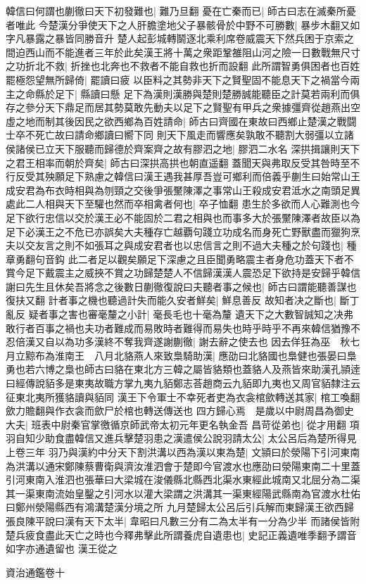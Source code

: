 韓信曰何謂也蒯徹曰天下初發難也|{
	難乃旦翻}
憂在亡秦而已|{
	師古曰志在滅秦所憂者唯此}
今楚漢分爭使天下之人肝膽塗地父子暴骸骨於中野不可勝數|{
	暴步木翻又如字凡暴露之暴皆同勝音升}
楚人起彭城轉鬬逐北乘利席卷威震天下然兵困于京索之間迫西山而不能進者三年於此矣漢王將十萬之衆距鞏雒阻山河之險一日數戰無尺寸之功折北不救|{
	折挫也北奔也不救者不能自救也折而設翻}
此所謂智勇俱困者也百姓罷極怨望無所歸倚|{
	罷讀曰疲}
以臣料之其勢非天下之賢聖固不能息天下之禍當今兩主之命縣於足下|{
	縣讀曰懸}
足下為漢則漢勝與楚則楚勝誠能聽臣之計莫若兩利而俱存之參分天下鼎足而居其勢莫敢先動夫以足下之賢聖有甲兵之衆據彊齊從趙燕出空虛之地而制其後因民之欲西鄉為百姓請命|{
	師古曰齊國在東故曰西鄉止楚漢之戰闘士卒不死亡故曰請命鄉讀曰嚮下同}
則天下風走而響應矣孰敢不聽割大弱彊以立諸侯諸侯已立天下服聽而歸德於齊案齊之故有膠泗之地|{
	膠泗二水名}
深拱揖讓則天下之君王相率而朝於齊矣|{
	師古曰深拱高拱也朝直遥翻}
蓋聞天與弗取反受其咎時至不行反受其殃願足下熟慮之韓信曰漢王遇我甚厚吾豈可鄉利而倍義乎蒯生曰始常山王成安君為布衣時相與為刎頸之交後爭張黶陳澤之事常山王殺成安君泜水之南頭足異處此二人相與天下至驩也然而卒相禽者何也|{
	卒子恤翻}
患生於多欲而人心難測也今足下欲行忠信以交於漢王必不能固於二君之相與也而事多大於張黶陳澤者故臣以為足下必漢王之不危已亦誤矣大夫種存亡越覇句踐立功成名而身死亡野獸盡而獵狗烹夫以交友言之則不如張耳之與成安君者也以忠信言之則不過大夫種之於句踐也|{
	種章勇翻句音鈎}
此二者足以觀矣願足下深慮之且臣聞勇略震主者身危功蓋天下者不賞今足下戴震主之威挾不賞之功歸楚楚人不信歸漢漢人震恐足下欲持是安歸乎韓信謝曰先生且休矣吾將念之後數日蒯徹復說曰夫聽者事之候也|{
	師古曰謂能聽善謀也復扶又翻}
計者事之機也聽過計失而能久安者鮮矣|{
	鮮息善反}
故知者决之斷也|{
	斷丁亂反}
疑者事之害也審毫釐之小計|{
	毫長毛也十毫為釐}
遺天下之大數智誠知之决弗敢行者百事之禍也夫功者難成而易敗時者難得而易失也時乎時乎不再來韓信猶豫不忍倍漢又自以為功多漢終不奪我齊遂謝蒯徹|{
	謝去辭之使去也}
因去佯狂為巫　秋七月立黥布為淮南王　八月北貉燕人來致梟騎助漢|{
	應劭曰北貉國也梟健也張晏曰梟勇也若六博之梟也師古曰貉在東北方三韓之屬皆貉類也蓋貉人及燕皆來助漢孔頴逹曰經傳說貊多是東夷故職方掌九夷九貊鄭志荅趙商云九貊即九夷也又周官貊隸注云征東北夷所獲貉讀與貊同}
漢王下令軍士不幸死者吏為衣衾棺歛轉送其家|{
	棺工喚翻歛力贍翻與作衣衾而歛尸於棺也轉送傳送也}
四方歸心焉　是歲以中尉周昌為御史大夫|{
	班表中尉秦官掌徼循京師武帝太初元年更名執金吾}
昌苛從弟也|{
	從才用翻}
項羽自知少助食盡韓信又進兵擊楚羽患之漢遣侯公說羽請太公|{
	太公呂后為楚所得見上卷三年}
羽乃與漢約中分天下割洪溝以西為漢以東為楚|{
	文頴曰於滎陽下引河東南為洪溝以通宋鄭陳蔡曹衛與濟汝淮泗會于楚即今官渡水也應劭曰滎陽東南二十里蓋引河東南入淮泗也張華曰大梁城在浚儀縣北縣西北渠水東經此城南又北屈分為二渠其一渠東南流始皇鑿之引河水以灌大梁謂之洪溝其一渠東經陽武縣南為官渡水杜佑曰鄭州滎陽縣西有鴻溝楚漢分境之所}
九月楚歸太公呂后引兵解而東歸漢王欲西歸張良陳平說曰漢有天下太半|{
	韋昭曰凡數三分有二為太半有一分為少半}
而諸侯皆附楚兵疲食盡此天亡之時也今釋弗擊此所謂養虎自遺患也|{
	史記正義遺唯季翻予謂音如字亦通遺留也}
漢王從之

資治通鑑卷十
